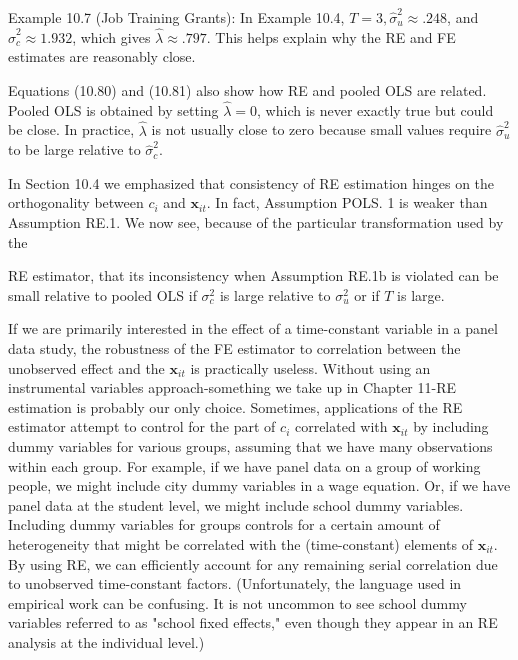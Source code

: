 \documentclass[10pt]{article}
\begin{document}
Example 10.7 (Job Training Grants): In Example 10.4, $T=3, \hat{\sigma}_{u}^{2} \approx .248$, and $\hat{\sigma}_{c}^{2} \approx 1.932$, which gives $\hat{\lambda} \approx .797$. This helps explain why the RE and FE estimates are reasonably close.

Equations (10.80) and (10.81) also show how RE and pooled OLS are related. Pooled OLS is obtained by setting $\hat{\lambda}=0$, which is never exactly true but could be close. In practice, $\hat{\lambda}$ is not usually close to zero because small values require $\hat{\sigma}_{u}^{2}$ to be large relative to $\hat{\sigma}_{c}^{2}$.

In Section 10.4 we emphasized that consistency of RE estimation hinges on the orthogonality between $c_{i}$ and $\mathbf{x}_{i t}$. In fact, Assumption POLS. 1 is weaker than Assumption RE.1. We now see, because of the particular transformation used by the

RE estimator, that its inconsistency when Assumption RE.1b is violated can be small relative to pooled OLS if $\sigma_{c}^{2}$ is large relative to $\sigma_{u}^{2}$ or if $T$ is large.

If we are primarily interested in the effect of a time-constant variable in a panel data study, the robustness of the FE estimator to correlation between the unobserved effect and the $\mathbf{x}_{i t}$ is practically useless. Without using an instrumental variables approach-something we take up in Chapter 11-RE estimation is probably our only choice. Sometimes, applications of the RE estimator attempt to control for the part of $c_{i}$ correlated with $\mathbf{x}_{i t}$ by including dummy variables for various groups, assuming that we have many observations within each group. For example, if we have panel data on a group of working people, we might include city dummy variables in a wage equation. Or, if we have panel data at the student level, we might include school dummy variables. Including dummy variables for groups controls for a certain amount of heterogeneity that might be correlated with the (time-constant) elements of $\mathbf{x}_{i t}$. By using RE, we can efficiently account for any remaining serial correlation due to unobserved time-constant factors. (Unfortunately, the language used in empirical work can be confusing. It is not uncommon to see school dummy variables referred to as "school fixed effects," even though they appear in an RE analysis at the individual level.)
\end{document}
